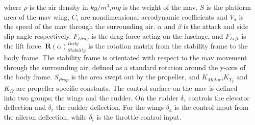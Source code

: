 where $\rho$ is the air density in $kg/m^3$,$mg$ is the weight of the \gls{mav}, $S$ is the platform area of the \gls{mav} wing, $C_i$ are nondimensional aerodynamic coefficients and $V_a$ is the speed of the \gls{mav} through the surrounding air. $\alpha$ and $\beta$ is the attack and side slip angle respectively. $F_{Drag}$ is the drag force acting on the fuselage, and $F_{Lift}$ is the lift force. $\mathbf{R}(\alpha)_{Stability}^{Body}$ is the rotation matrix from the stability frame to the body frame. The stability frame is orientated with respect to the \gls{mav} movement through the surrounding air, defined as a standard rotation around the y-axis of the body frame. $S_{Prop}$ is the area swept out by the propeller, and $K_{Motor}$,$K_{T_p}$ and $K_\Omega$ are propeller specific constants. The control surface on the \gls{mav} is defined into two groups; the wings and the rudder. On the rudder $\delta_e$ controls the elevator deflection and $\delta_r$ the rudder deflection. For the wings $\delta_a$ is the control input from the aileron deflection, while $\delta_t$ is the throttle control input.
